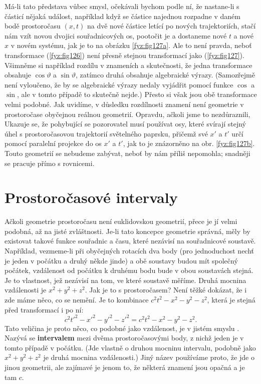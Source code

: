 {    Má-li tato představa vůbec smysl, očekávali bychom podle ní, že nastane-li s částicí nějaká 
    událost, například když se částice najednou rozpadne v daném bodě prostoročasu \((x, t)\) na 
    dvě nové částice letící po nových trajektoriích, stačí nám vzít novou dvojici souřadnicových 
    os, pootočit je a dostaneme nové \(t\) a nové \(x\) v novém systému, jak je to na obrázku 
    \ref{fyz:fig127a}. Ale to není pravda, neboť transformace (\ref{fyz:fig126}) není přesně 
    stejnou transformací jako (\ref{fyz:fig127}). Všimněme si například rozdílu v znameních a 
    skutečnosti, že jedna transformace obsahuje \(\cos\vartheta\) a \(\sin\vartheta\), zatímco 
    druhá obsahuje algebraické výrazy. (Samozřejmě není vyloučeno, že by se algebraické výrazy 
    nedaly vyjádřit pomocí funkce \(\cos\) a \(\sin\), ale v tomto případě to skutečně nejde.) 
    Přesto si však jsou obě transformace velmi podobné. Jak uvidíme, v důsledku rozdílnosti znamení 
    není geometrie v prostoročase obyčejnou reálnou geometrií. Opravdu, ačkoli jsme to 
    nezdůraznili, Ukazuje se, že pohybující se pozorovatel musí používat osy, které svírají stejný 
    úhel s prostoročasovou trajektorií světelného paprsku, přičemž své \(x'\) a \(t'\) určí pomocí 
    paralelní projekce do os \(x'\) a \(t'\), jak to je znázorněno na obr. \ref{fyz:fig127b}. Touto 
    geometrií se nebudeme zabývat, neboť by nám příliš nepomohla; snadněji se pracuje přímo s 
    rovnicemi.
    
  \section{Prostoročasové intervaly}\label{fyz:IchapXVIIsecII}
    Ačkoli geometrie prostoročasu není euklidovskou geometrií, přece je jí velmi podobná, až na 
    jisté zvláštnosti. Je-li tato koncepce geometrie správná, měly by existovat takové funkce 
    souřadnic a času, které nezávisí na souřadnicové soustavě. Například, vezmeme-li při obyčejných 
    rotacích dva body (pro jednoduchost nechť je jeden v počátku a druhý někde jinde) a obě 
    soustavy budou mít společný počátek, vzdálenost od počátku k druhému bodu bude v obou 
    soustavách stejná. Je to vlastnost, jež nezávisí na tom, ve které soustavě měříme. Druhá 
    mocnina vzdálenosti je \(x^2 + y^2 + z^2\). Jak je to s prostoročasem? Není těžké dokázat, že i 
    zde máme něco, co se nemění. Je to kombinace \(c^2t^2 - x^2 - y^2 - z^2\), která je stejná před 
    transformací i po ní:
    \begin{equation}\label{FYZ:eq222}
      c^2t'^2 - x'^2 - y'^2 - z'^2 = c^2t^2 - x^2 - y^2 - z^2.
    \end{equation}
    Tato veličina je proto něco, co podobné jako vzdálenost, je v jistém smyslu . Nazývá 
    se \textbf{intervalem} mezi dvěma prostoročasovými body, z nichž jeden je v tomto případě v 
    počátku. (Jde vlastně o druhou mocninu intervalu, podobně jako \(x^2 + y^2 + z^2\) je druhá 
    mocnina vzdálenosti.) Jiný název používáme proto, že jde o jinou geometrii, ale zajímavé je 
    jenom to, že některá znamení jsou opačná a je tam \(c\).
    
}
